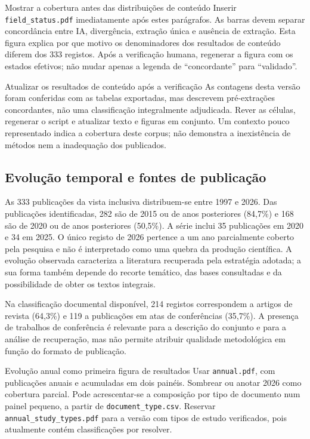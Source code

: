 {Mostrar a cobertura antes das distribuições de conteúdo}
{Inserir \texttt{field\_status.pdf} imediatamente após estes parágrafos.
As barras devem separar concordância entre IA, divergência, extração
única e ausência de extração. Esta figura explica por que motivo os
denominadores dos resultados de conteúdo diferem dos 333 registos.
Após a verificação humana, regenerar a figura com os estados efetivos;
não mudar apenas a legenda de ``concordante'' para ``validado''.}%

{Atualizar os resultados de conteúdo após a verificação}
{As contagens desta versão foram conferidas com as tabelas exportadas,
mas descrevem pré-extrações concordantes, não uma classificação
integralmente adjudicada. Rever as células, regenerar o script e
atualizar texto e figuras em conjunto. Um contexto pouco representado
indica a cobertura deste corpus; não demonstra a inexistência de
métodos nem a inadequação dos publicados.}%

\subsection{Evolução temporal e fontes de publicação}

As 333 publicações da vista inclusiva distribuem-se entre 1997 e 2026.
Das publicações identificadas, 282 são de 2015 ou de anos posteriores
(84,7\%) e 168 são de 2020 ou de anos posteriores (50,5\%). A série
inclui 35 publicações em 2020 e 34 em 2025. O único registo de 2026
pertence a um ano parcialmente coberto pela pesquisa e não é
interpretado como uma quebra da produção científica. A evolução
observada caracteriza a literatura recuperada pela estratégia
adotada; a sua forma também depende do recorte temático, das bases
consultadas e da possibilidade de obter os textos integrais.

Na classificação documental disponível, 214 registos correspondem
a artigos de revista (64,3\%) e 119 a publicações em atas de
conferências (35,7\%). A presença de trabalhos de conferência é
relevante para a descrição do conjunto e para a análise de
recuperação, mas não permite atribuir qualidade metodológica
em função do formato de publicação.

{Evolução anual como primeira figura de resultados}
{Usar \texttt{annual.pdf}, com publicações anuais e acumuladas em
dois painéis. Sombrear ou anotar 2026 como cobertura parcial. Pode
acrescentar-se a composição por tipo de documento num painel pequeno,
a partir de \texttt{document\_type.csv}. Reservar
\texttt{annual\_study\_types.pdf} para a versão com tipos de estudo
verificados, pois atualmente contém classificações por resolver.}%

